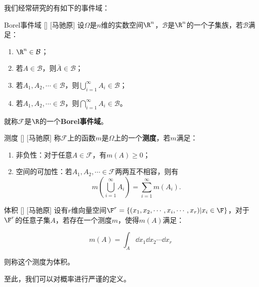 \documentclass[UTF8]{ctexart}
\begin{document}
        我们经常研究的有如下的事件域：

        \begin{dfn}
            []
            {Borel事件域}
            []
            [马驰原]
            设$\Omega$是$n$维的实数空间$\R^n$，$\mathcal{B}$是$\R^n$的一个子集族，若$\mathcal{B}$满足：

            \begin{enumerate}
                \item $\R^n\in\mathcal{B}$；
                \item 若$A\in\mathcal{B}$，则$\bar{A}\in\mathcal{B}$；
                \item 若$A_1,A_2,\cdots\in\mathcal{B}$，则$\bigcup_{i=1}^{\infty}A_i\in\mathcal{B}$；
                \item 若$A_1,A_2,\cdots\in\mathcal{B}$，则$\bigcap_{i=1}^{\infty}A_i\in\mathcal{B}$。
            \end{enumerate}
            就称$\mathcal{F}$是$\R$的一个\textbf{Borel事件域}。
        \end{dfn}

        \begin{dfn}
            []
            {测度}
            []
            [马驰原]
            称$\mathcal{F}$上的函数$m$是$\Omega$上的一个\textbf{测度}，若$m$满足：

            \begin{enumerate}
                \item 非负性：对于任意$A\in\mathcal{F}$，有$m(A)\geq 0$；
                \item 空间的可加性：若$A_1,A_2,\cdots\in\mathcal{F}$两两互不相容，则有\[m\left(\bigcup_{i=1}^{\infty}A_i\right)=\sum_{i=1}^{\infty}m(A_i).\]
            \end{enumerate}
        \end{dfn}

        \begin{dfn}
            []
            {体积}
            []
            [马驰原]
            设有$r$维向量空间$\F^r=\left\{(x_1,x_2,\cdots,x_i,\cdots,x_r)|x_i\in\F\right\} $，对于$\F^r$的任意子集$A$，若存在一个测度$m$，使得$m(A)$满足：

            \[m(A)=\int_{A}\dd x_1\dd x_2\cdots\dd x_r\]

            则称这个测度为体积。
        \end{dfn}

        至此，我们可以对概率进行严谨的定义。
\end{document}
